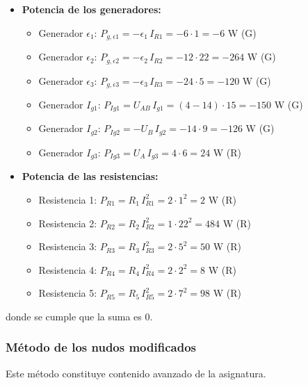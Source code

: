 \begin{example}
\begin{itemize}
    \item \textbf{Potencia de los generadores:}
    \begin{itemize}
        \item Generador $\epsilon_1$: $P_{g,\epsilon1}=-\epsilon_1\,I_{R1}=-6\cdot 1=-6$ W (G)
        \item Generador $\epsilon_2$:  $P_{g,\epsilon2}=-\epsilon_2\,I_{R2}=-12\cdot 22=-264$ W (G)
        \item Generador $\epsilon_3$:  $P_{g,\epsilon3}=-\epsilon_3\,I_{R3}=-24\cdot 5=-120$ W (G)
        \item Generador $I_{g1}$: $P_{Ig1}=U_{AB}\,I_{g1}=(4-14)\cdot 15=-150$ W (G)
        \item Generador $I_{g2}$:  $P_{Ig2}=-U_B\,I_{g2}=-14\cdot 9=-126$ W (G)
        \item Generador $I_{g3}$:  $P_{Ig3}=U_{A}\,I_{g3}=4\cdot 6=24$ W (R)
    \end{itemize}
    \item \textbf{Potencia de las resistencias:}
    \begin{itemize}
        \item Resistencia 1: $P_{R1}=R_1\,I_{R1}^2=2\cdot 1^2=2$ W (R)
        \item Resistencia 2: $P_{R2}=R_2\,I_{R2}^2=1\cdot 22^2=484$ W (R)
        \item Resistencia 3: $P_{R3}=R_3\,I_{R3}^2=2\cdot 5^2=50$ W (R)
        \item Resistencia 4: $P_{R4}=R_4\,I_{R4}^2=2\cdot 2^2=8$ W (R)
        \item Resistencia 5: $P_{R5}=R_5\,I_{R5}^2=2\cdot 7^2=98$ W (R)
    \end{itemize}
\end{itemize}
donde se cumple que la suma es 0.
	\end{example}
	
	\subsubsection{Método de los nudos modificados}\label{sec.nudos_modificados}
	
	\begin{remark}
	    Este método constituye contenido avanzado de la asignatura.
	\end{remark}
	
